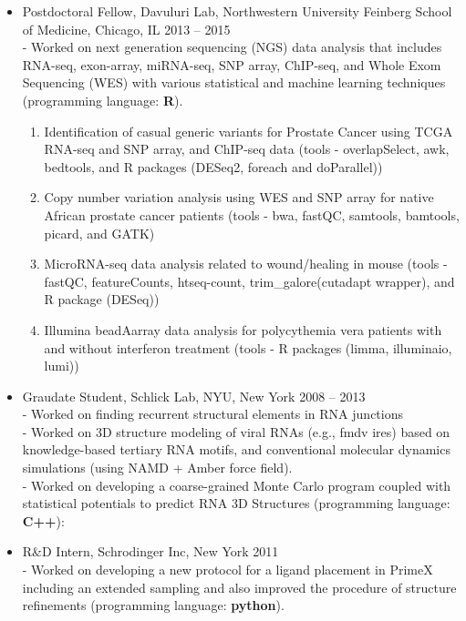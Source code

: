 \documentclass[letterpaper,11pt]{article}
\newcommand{\resitem}[1]{\item #1 \vspace{-2pt}}
\begin{document}
\begin{itemize}
\item
	{Postdoctoral Fellow, Davuluri Lab, Northwestern University Feinberg School of Medicine, Chicago, IL \cftdotfill{\cftsecdotsep} 2013 -- 2015}\\
    - Worked on next generation sequencing (NGS) data analysis that includes RNA-seq, exon-array, miRNA-seq, SNP array, ChIP-seq, and Whole Exom Sequencing (WES) with various statistical and machine learning techniques (programming language: \textbf{R}). \\

    \begin{enumerate}[1)]
    		\item
    			Identification of casual generic variants for Prostate Cancer using TCGA RNA-seq and SNP array, and ChIP-seq data (tools - overlapSelect, awk, bedtools, and R packages (DESeq2, foreach and doParallel))
    	    \item
    	    		Copy number variation analysis using WES and SNP array for native African prostate cancer patients (tools - bwa, fastQC, samtools, bamtools, picard, and GATK)
    		\item
    			MicroRNA-seq data analysis related to wound/healing in mouse (tools - fastQC, featureCounts, htseq-count, trim\_galore(cutadapt wrapper), and R package (DESeq))
    		\item
    			Illumina beadAarray data analysis for polycythemia vera patients with and without interferon  treatment (tools - R packages (limma, illuminaio, lumi))

    \end{enumerate}

	\resitem{Graudate Student, Schlick Lab, NYU, New York\cftdotfill{\cftsecdotsep} 2008 -- 2013}	\\
	- Worked on finding recurrent structural elements in RNA junctions\\
	- Worked on 3D structure modeling of viral RNAs (e.g., fmdv ires) based on knowledge-based tertiary RNA motifs, and conventional molecular dynamics simulations (using NAMD + Amber force field). \\
	- Worked on developing a coarse-grained Monte Carlo program coupled with statistical potentials to predict RNA 3D Structures	(programming language: \textbf{C++}):

	\resitem{R\&D Intern, Schrodinger Inc, New York\cftdotfill{\cftsecdotsep} 2011}\\
    - Worked on developing a new protocol for a ligand placement in PrimeX including an extended sampling and also improved the procedure of structure refinements (programming language: \textbf{python}).


\end{itemize}
\end{document}
